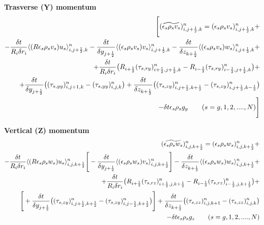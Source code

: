 {\bf Trasverse (Y) momentum}\\
%
\begin{eqnarray}
\htmlimage{}
\Bigg[
(\widetilde{\epsilon_s \rho_s v_s})_{i,j+\frac{1}{2},k}^{n} =
(\epsilon_s \rho_s v_s)_{i,j+\frac{1}{2},k}^{n} +
\nonumber \\
- \frac{\delta t}{R_{i} \delta r_{i}} 
\langle (R \epsilon_s \rho_s v_s) u_s \rangle_{i,j+\frac{1}{2},k}^{n} -
\frac{\delta t} {\delta y_{j+\frac{1}{2}}} 
\langle (\epsilon_s \rho_s v_s) v_s \rangle_{i,j+\frac{1}{2},k}^{n} -
\frac{\delta t} {\delta z_{k+\frac{1}{2}}} 
\langle (\epsilon_s \rho_s v_s) w_s \rangle_{i,j+\frac{1}{2},k}^{n} + 
\nonumber \\
+ \frac{\delta t} {R_{i} \delta r_{i}} 
\big(R_{i+\frac{1}{2}}(\tau_{s,ry})_{i+\frac{1}{2},j+\frac{1}{2},k}^{n} 
- R_{i-\frac{1}{2}} (\tau_{s,ry})_{i-\frac{1}{2},j+\frac{1}{2},k}^{n} \big) +
\nonumber \\
+ \frac{\delta t} {\delta y_{j+\frac{1}{2}}}
\big( (\tau_{s,yy})_{i,j+1,k}^{n} - (\tau_{s,yy})_{i,j,k}^{n} \big)
+ \frac{\delta t} {\delta z_{k+\frac{1}{2}}}
\big( (\tau_{s,zy})_{i,j+\frac{1}{2},k+\frac{1}{2}}^{n} - (\tau_{s,zy})_{i,j+\frac{1}{2},k-\frac{1}{2}}^{n} \big)
\nonumber \\
- \delta t \epsilon_s \rho_s g_y
\qquad (s=g,1,2, ....,N)
\Bigg]
\nonumber
\end{eqnarray}

{\bf Vertical (Z) momentum}\\
%
\begin{eqnarray}
\htmlimage{}
(\widetilde{\epsilon_s \rho_s w_s})_{i,j,k+\frac{1}{2}}^{n} =
(\epsilon_s \rho_s w_s)_{i,j,k+\frac{1}{2}}^{n} +
\nonumber \\
- \frac{\delta t}{R_{i} \delta r_{i}} 
\langle (R \epsilon_s \rho_s w_s) u_s \rangle_{i,j,k+\frac{1}{2}}^{n}
\Bigg[
- \frac{\delta t} {\delta y_{j+\frac{1}{2}}} 
\langle (\epsilon_s \rho_s w_s) v_s \rangle_{i,j,k+\frac{1}{2}}^{n}
\Bigg]
- \frac{\delta t} {\delta z_{k+\frac{1}{2}}} 
\langle (\epsilon_s \rho_s w_s) w_s \rangle_{i,j,k+\frac{1}{2}}^{n} + 
\nonumber \\
+ \frac{\delta t} {R_{i} \delta r_{i}} 
\big(R_{i+\frac{1}{2}}(\tau_{s,rz})_{i+\frac{1}{2},j,k+\frac{1}{2}}^{n} 
- R_{i-\frac{1}{2}} (\tau_{s,rz})_{i-\frac{1}{2},j,k+\frac{1}{2}}^{n} \big) +
\nonumber \\
\Bigg[
+ \frac{\delta t} {\delta y_{j+\frac{1}{2}}}
\big( (\tau_{s,zy})_{i,j+\frac{1}{2},k+\frac{1}{2}}^{n} - (\tau_{s,zy})_{i,j-\frac{1}{2},k+\frac{1}{2}}^{n} \big)
\Bigg]
+ \frac{\delta t} {\delta z_{k+\frac{1}{2}}}
\big( (\tau_{s,zz})_{i,j,k+1}^{n} - (\tau_{s,zz})_{i,j,k}^{n} \big)
\nonumber \\
- \delta t \epsilon_s \rho_s g_z
\qquad (s=g,1,2, ....,N)
\nonumber
\end{eqnarray}

